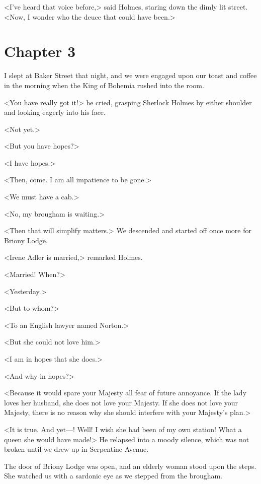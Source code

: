 <I've heard that voice before,> said Holmes, staring down the dimly lit street. <Now, I wonder who the deuce that could have been.>

\cleardoubleoddpage
\vspace*{10pt}
\section{Chapter 3}
\thispagestyle{plain}

\lettrine[lines=4]{I}{} slept at Baker Street that night, and we were engaged upon our toast and coffee in the morning when the King of Bohemia rushed into the room.

\zz
<You have really got it!> he cried, grasping Sherlock Holmes by either shoulder and looking eagerly into his face.

<Not yet.>

<But you have hopes?>

<I have hopes.>

<Then, come. I am all impatience to be gone.>

<We must have a cab.>

<No, my brougham is waiting.>

<Then that will simplify matters.> We descended and started off once more for Briony Lodge.

<Irene Adler is married,> remarked Holmes.

<Married! When?>

<Yesterday.>

<But to whom?>

<To an English lawyer named Norton.>

<But she could not love him.>

<I am in hopes that she does.>

<And why in hopes?>

<Because it would spare your Majesty all fear of future annoyance. If the lady loves her husband, she does not love your Majesty. If she does not love your Majesty, there is no reason why she should interfere with your Majesty's plan.>

<It is true. And yet—! Well! I wish she had been of my own station! What a queen she would have made!> He relapsed into a moody silence, which was not broken until we drew up in Serpentine Avenue.

The door of Briony Lodge was open, and an elderly woman stood upon the steps. She watched us with a sardonic eye as we stepped from the brougham.

